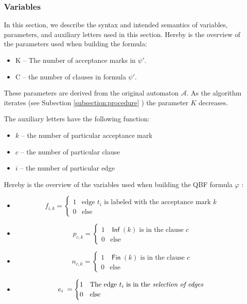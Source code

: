 \documentclass[a4paper,UKenglish,cleveref, autoref, thm-restate]{lipics-v2021}
\DeclareMathOperator{\Inf}{\mathsf{Inf}}
\DeclareMathOperator{\Fin}{\mathsf{Fin}}
\begin{document}
\subsubsection{Variables}
In this section, we describe the syntax and intended semantics of variables, parameters, and auxiliary letters used in this section.
Hereby is the overview of the parameters used when building the formula:
\begin{itemize}
    \item K -- The number of acceptance marks in $\psi'$.
    \item C -- the number of clauses in formula $\psi'$.
\end{itemize}

These parameters are derived from the original automaton $\mathcal{A}$. As the algorithm iterates (see Subection \ref{subsection:procedure} )  the parameter $K$ decreases.

\smallskip

The auxiliary letters have the following function:
\begin{itemize}
    \item $k$ -- the number of particular acceptance mark
    \item $c$ -- the number of particular clause
    \item $i$ -- the number of particular edge 
\end{itemize}

Hereby is the overview of the variables used when building the QBF formula $\varphi$ :
\begin{itemize}
    \item $$f_{i,k} = \begin{cases}
    1& \text{edge }t_{i} \text{ is labeled with the acceptance mark }k\\
    0& \text{else}
\end{cases}$$
\item $$p_{c,k} = \begin{cases}
    1& \Inf(k) \text{ is in the clause }c\\
    0& \text{else}
\end{cases}$$
\item $$n_{c,k}= \begin{cases}
    1& \Fin(k) \text{ is in the clause }c\\
    0& \text{else}
\end{cases}$$
\item $$e_{i} \;= \begin{cases}
    1& \text{The edge } t_{i} \text{ is in the \emph{selection of edges} }\\
    0& \text{else}
\end{cases}$$
\end{itemize}
\end{document}
